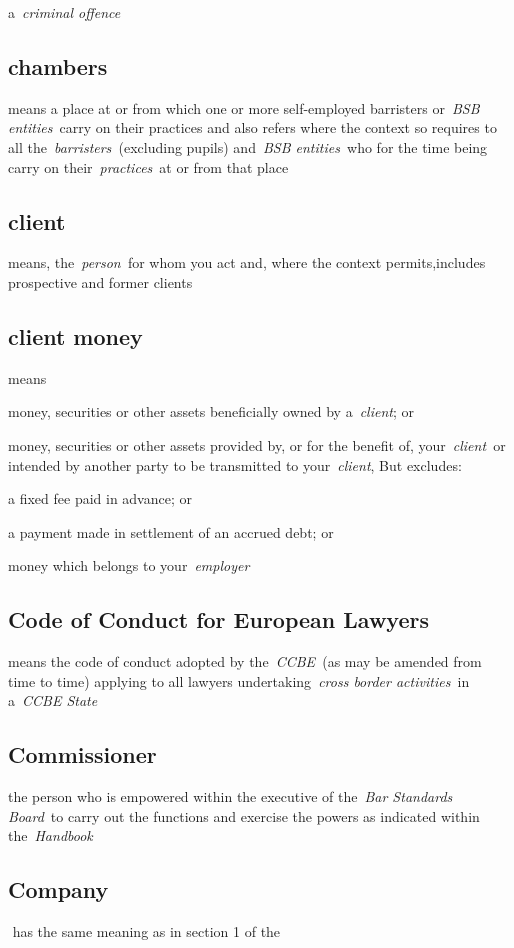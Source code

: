   a~\emph{criminal offence}\lr\la\subsection{chambers } means a place at or from which one or more
  self-employed barristers or~\emph{BSB entities~}carry on their
  practices and also refers where the context so requires to all
  the~\emph{barristers~}(excluding pupils) and~\emph{BSB entities~}who
  for the time being carry on their~\emph{practices}~at or from that
  place  \subsection{client } means, the~\emph{person~}for whom you act and, where
  the context permits,includes prospective and former clients  \subsection{client money } means
\al \item money, securities or other assets
  beneficially owned by a~\emph{client}; or \item money, securities or
  other assets provided by, or for the benefit of, your~\emph{client~}or
  intended by another party to be transmitted to your~\emph{client}, But
  excludes: \item a fixed fee paid in advance; or \item a payment made in
  settlement of an accrued debt; or \item money which belongs to
  your~\emph{employer} \la\subsection{Code of Conduct for European Lawyers } means the code of
  conduct adopted by the~\emph{CCBE~}(as may be amended from time to
  time) applying to all lawyers undertaking~\emph{cross border
  activities~}in a~\emph{CCBE State} \subsection{Commissioner }the person who is empowered within the
  executive of the~\emph{Bar Standards Board}~to carry out the functions
  and exercise the powers as indicated within the~\emph{Handbook} \subsection{Company } has the same meaning as in section 1 of the
